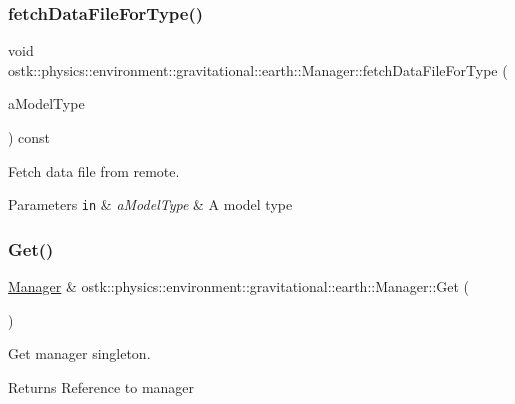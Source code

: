 \subsubsection{\texorpdfstring{fetch\+Data\+File\+For\+Type()}{fetchDataFileForType()}}
{\footnotesize\ttfamily void ostk\+::physics\+::environment\+::gravitational\+::earth\+::\+Manager\+::fetch\+Data\+File\+For\+Type (\begin{DoxyParamCaption}\item[{const \hyperlink{classostk_1_1physics_1_1environment_1_1gravitational_1_1_earth_a9895df78b5c5aab5e981bf765f8c0f05}{Earth\+Gravitational\+Model\+::\+Type} \&}]{a\+Model\+Type }\end{DoxyParamCaption}) const}



Fetch data file from remote. 


\begin{DoxyParams}[1]{Parameters}
\mbox{\tt in}  & {\em a\+Model\+Type} & A model type \\
\hline
\end{DoxyParams}
\mbox{\label{classostk_1_1physics_1_1environment_1_1gravitational_1_1earth_1_1_manager_a8665dccf68085ce30fb0afcd8d6c71a3}} 
\subsubsection{\texorpdfstring{Get()}{Get()}}
{\footnotesize\ttfamily \hyperlink{classostk_1_1physics_1_1environment_1_1gravitational_1_1earth_1_1_manager}{Manager} \& ostk\+::physics\+::environment\+::gravitational\+::earth\+::\+Manager\+::\+Get (\begin{DoxyParamCaption}{ }\end{DoxyParamCaption})\hspace{0.3cm}{\ttfamily [static]}}



Get manager singleton. 

\begin{DoxyReturn}{Returns}
Reference to manager 
\end{DoxyReturn}
\mbox{\label{classostk_1_1physics_1_1environment_1_1gravitational_1_1earth_1_1_manager_aec5c97d1dc02e1f019c3a77f827d7da7}} 
